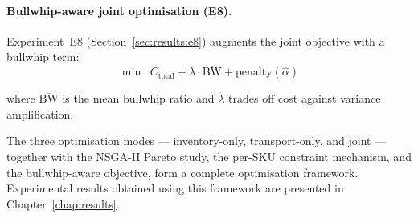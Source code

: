 \paragraph{Bullwhip-aware joint optimisation (E8).}
Experiment~E8 (Section~\ref{sec:results:e8}) augments the joint
objective with a bullwhip term:
\vspace{-0.1em}
\begin{equation}
  \min \;\; C_{\text{total}}
            + \lambda \cdot \overline{\text{BW}}
            + \text{penalty}(\hat{\alpha})
  \label{eq:bullwhip-objective}
\end{equation}

where $\overline{\text{BW}}$ is the mean bullwhip ratio and $\lambda$
trades off cost against variance amplification.

The three optimisation modes --- inventory-only, transport-only, and
joint --- together with the NSGA-II Pareto study, the per-SKU
constraint mechanism, and the bullwhip-aware objective, form a complete
optimisation framework.  Experimental results obtained using this
framework are presented in Chapter~\ref{chap:results}.
